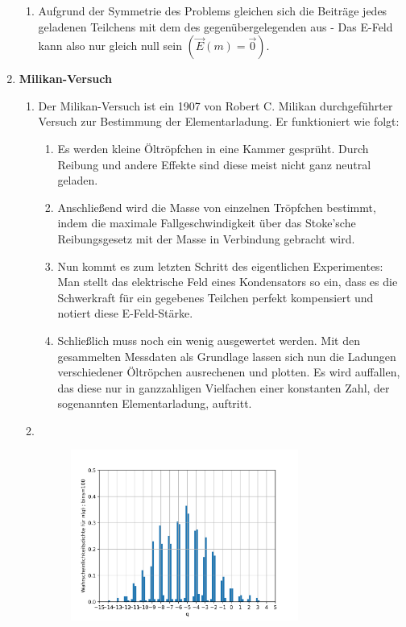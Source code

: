 \documentclass[11pt,letterpaper]{article}
\begin{document}
\begin{enumerate}
\begin{enumerate}
            \item
            Aufgrund der Symmetrie des Problems gleichen sich die Beiträge jedes 
            geladenen Teilchens mit dem des gegenübergelegenden aus - Das E-Feld 
            kann also nur gleich null sein $(\vec{E}(m)=\vec{0})$.
        \end{enumerate}

    
    \item \textbf{Milikan-Versuch}
        \begin{enumerate}
            \item
            Der Milikan-Versuch ist ein 1907 von Robert C. Milikan durchgeführter
            Versuch zur Bestimmung der Elementarladung. Er funktioniert wie folgt:
            \begin{enumerate}
                \item Es werden kleine Öltröpfchen in eine Kammer gesprüht. Durch Reibung und
                 andere Effekte sind diese meist nicht ganz neutral geladen.
                \item Anschließend wird die Masse von einzelnen Tröpfchen bestimmt, indem die maximale
                Fallgeschwindigkeit über das Stoke'sche Reibungsgesetz mit der Masse in
                Verbindung gebracht wird.
                \item Nun kommt es zum letzten Schritt des eigentlichen Experimentes: Man stellt das elektrische Feld eines Kondensators
                so ein, dass es die Schwerkraft für ein gegebenes Teilchen perfekt kompensiert und notiert diese E-Feld-Stärke. 
                \item Schließlich muss noch ein wenig ausgewertet werden. Mit den gesammelten Messdaten als Grundlage
                lassen sich nun die Ladungen verschiedener Öltröpchen ausrechenen und plotten. Es wird auffallen, 
                das diese nur in ganzzahligen Vielfachen einer konstanten Zahl, der sogenannten Elementarladung, auftritt.
            \end{enumerate}

            \item \,
            \begin{figure}[h!]
                \begin{center}
                    \includegraphics[width = 0.75\textwidth]{hist}
                \end{center}
            \end{figure}


\end{enumerate}
\end{enumerate}
\end{document}
